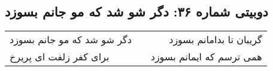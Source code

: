 \begin{center}
\section*{دوبیتی شماره ۳۶: دگر شو شد که مو جانم بسوزد}
\label{sec:036}
\begin{longtable}{l p{0.5cm} r}
دگر شو شد که مو جانم بسوزد
&&
گریبان تا بدامانم بسوزد
\\
برای کفر زلفت ای پریرخ
&&
همی ترسم که ایمانم بسوزد
\\
\end{longtable}
\end{center}
